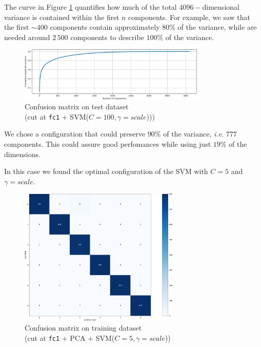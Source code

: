 \documentclass[compsoc]{IEEEtran}
\begin{document}
The curve in Figure \ref{fig:var1} quantifies how much of the total $4096-$dimensional variance is contained within the first $n$ components. For example, we saw that the first ${\sim400}$ components contain approximately $80\%$ of the variance, while are needed around $2\,500$ components to describe $100\%$ of the variance.
\begin{figure}[ht!]
\centering                                                                        
\includegraphics[width=3.5in]{../images/var-1.png}
\captionsetup{justification=centering}                                                                                         
\caption{Confusion matrix on test dataset \\ (cut at \texttt{fc1} + SVM($C=100, \gamma=scale$)))}
\label{fig:var1}                                                                                                                               
\end{figure}
We chose a configuration that could preserve $90\%$ of the variance, \emph{i.e.} $777$ components. This could assure good perfomances while using just $19\%$ of the dimensions.\par
In this case we found the optimal configuration of the SVM with $C=5$ and $\gamma=scale$.

\begin{figure}[ht!]
\centering                                                                        
\includegraphics[width=3in]{../images/cm1-pca-train.png}
\captionsetup{justification=centering}                                                                                         
\caption{Confusion matrix on training dataset \\ (cut at \texttt{fc1} + PCA + SVM($C=5, \gamma=scale$))}
\label{fig:cm1-pca-train}                                                                                                                               
\end{figure}
\end{document}
